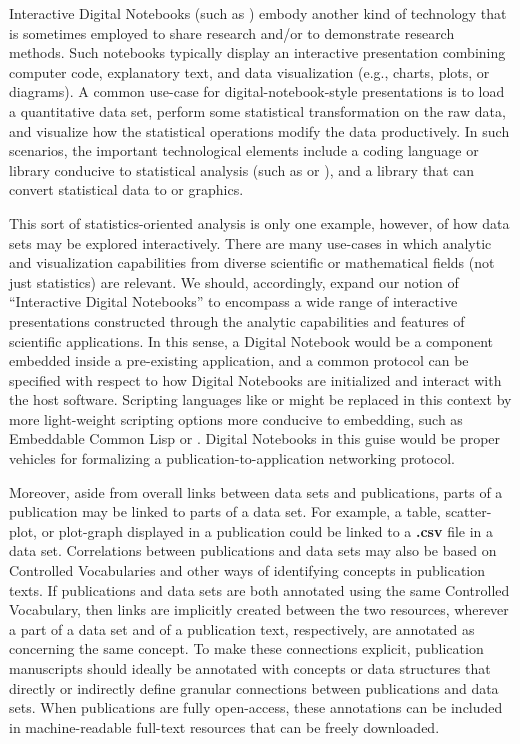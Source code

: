 \documentclass[12pt,letterpaper]{article}
\newcommand{\AngelScript}{\resizebox{!}{8pt}{\AcronymText{AngelScript}}}
\newcommand{\Jupyter}{\resizebox{!}{8pt}{\AcronymText{Jupyter}}}
\newcommand{\Python}{\resizebox{!}{8pt}{\AcronymText{Python}}}
\newcommand{\GUI}{\resizebox{!}{8pt}{\AcronymText{GUI}}}
\newcommand{\ThreeD}{\resizebox{!}{8pt}{\AcronymText{3D}}}
\newcommand{\TwoD}{\resizebox{!}{8pt}{\AcronymText{2D}}}
\newcommand{\textscc}[1]{{\color{orr!35!black}{{%
{\textsc{\textbf{#1}}}}}}}
\newcommand{\AcronymText}[1]{{\textscc{#1}}}
\newcommand{\Cpp}{\resizebox{!}{8pt}{\AcronymText{C++}}}
\newcommand{\R}{\resizebox{!}{8pt}{\AcronymText{R}}}
\newcommand{\p}[1]{

\vspace{.7em}#1}
\newcommand{\q}[1]{{\fontfamily{qcr}\selectfont ``}#1{\fontfamily{qcr}\selectfont ''}}
\begin{document}
{\p{Interactive Digital Notebooks (such as \Jupyter{}) embody 
another kind of technology that is sometimes employed 
to share research and/or to demonstrate research methods.  
Such notebooks typically display an interactive 
presentation combining computer code, explanatory text, 
and data visualization (e.g., charts, plots, or diagrams).  
A common use-case for digital-notebook-style presentations 
is to load a quantitative data set, perform some statistical 
transformation on the raw data, and visualize how the  
statistical operations modify the data productively.  
In such scenarios, the important technological elements 
include a coding language or library conducive to 
statistical analysis (such as \R{} or \Python{}), and a 
\GUI{} library that can convert statistical data to 
\TwoD{} or \ThreeD{} graphics.}

\p{This sort of statistics-oriented analysis is only one 
example, however, of how data sets may be explored interactively.  
There are many use-cases in which analytic and 
visualization capabilities from diverse scientific or mathematical 
fields (not just statistics) are relevant.  We should, accordingly, 
expand our notion of \q{Interactive Digital Notebooks} to encompass 
a wide range of interactive presentations constructed through the 
analytic capabilities and \GUI{} features of scientific 
applications.  In this sense, a Digital Notebook would be a 
component embedded inside a pre-existing application, and 
a common protocol can be specified with respect to how 
Digital Notebooks are initialized and interact with the 
host software.  Scripting languages like \R{} or \Python{} 
might be replaced in this context by more light-weight scripting options 
more conducive to \Cpp{} embedding, such as Embeddable Common Lisp  
or \AngelScript{}.  Digital Notebooks in this guise would be 
proper vehicles for formalizing a publication-to-application 
networking protocol.}

\p{Moreover, aside from overall links between data sets and publications, parts of a publication may be linked to parts of a data set.  For example, a table, scatter-plot, or plot-graph displayed in a publication could be linked to a \textbf{.csv} file in a data set.  Correlations between publications and data sets may also be based on Controlled Vocabularies and other ways of identifying concepts in publication texts.  If publications and data sets are both annotated using the same Controlled Vocabulary, then links are implicitly created between the two resources, wherever a part of a data set and of a publication text, respectively, are annotated as concerning the same concept.  To make these connections explicit, publication manuscripts should ideally be annotated with concepts or data structures that directly or indirectly define granular connections between publications and data sets.  When publications are fully open-access, these annotations can be included in machine-readable full-text resources that can be freely downloaded.}

}
\end{document}
